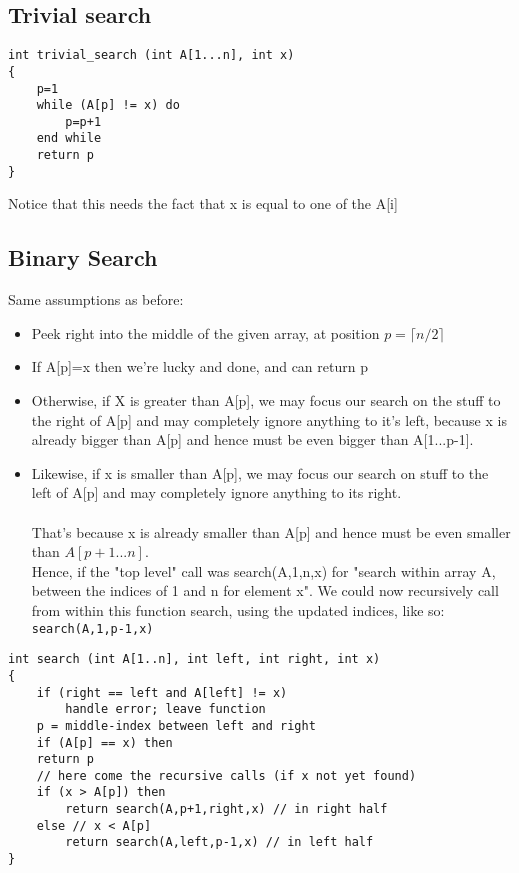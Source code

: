 \documentclass{article}[18pt]
\begin{document}
\subsection{Trivial search}
\begin{lstlisting}
int trivial_search (int A[1...n], int x)
{
	p=1
	while (A[p] != x) do
		p=p+1
	end while
	return p
}
\end{lstlisting}
Notice that this needs the fact that x is equal to one of the A[i]

\subsection{Binary Search}
Same assumptions as before:
\begin{itemize}
	\item Peek right into the middle of the given array, at position $p=\lceil n/2 \rceil$
	\item If A[p]=x then we're lucky and done, and can return p
	\item Otherwise, if X is greater than A[p], we may focus our search on the stuff to the right of A[p] and may completely ignore anything to it's left, because x is already bigger than A[p] and hence must be even bigger than A[1...p-1].
	\item Likewise, if x is smaller than A[p], we may focus our search on stuff to the left of A[p] and may completely ignore anything to its right.\\
	\\
	That's because x is already smaller than A[p] and hence must be even smaller than $A[p+1...n]$.\\
	Hence, if the "top level" call was search(A,1,n,x) for "search within array A, between the indices of 1 and n for element x". We could now recursively call from within this function search, using the updated indices, like so:\\
	\texttt{search(A,1,p-1,x)}
	
\end{itemize}
\newpage
\begin{lstlisting}
int search (int A[1..n], int left, int right, int x)
{
	if (right == left and A[left] != x)
		handle error; leave function
	p = middle-index between left and right
	if (A[p] == x) then
	return p
	// here come the recursive calls (if x not yet found)
	if (x > A[p]) then
		return search(A,p+1,right,x) // in right half
	else // x < A[p]
		return search(A,left,p-1,x) // in left half
}
\end{lstlisting}
\end{document}
